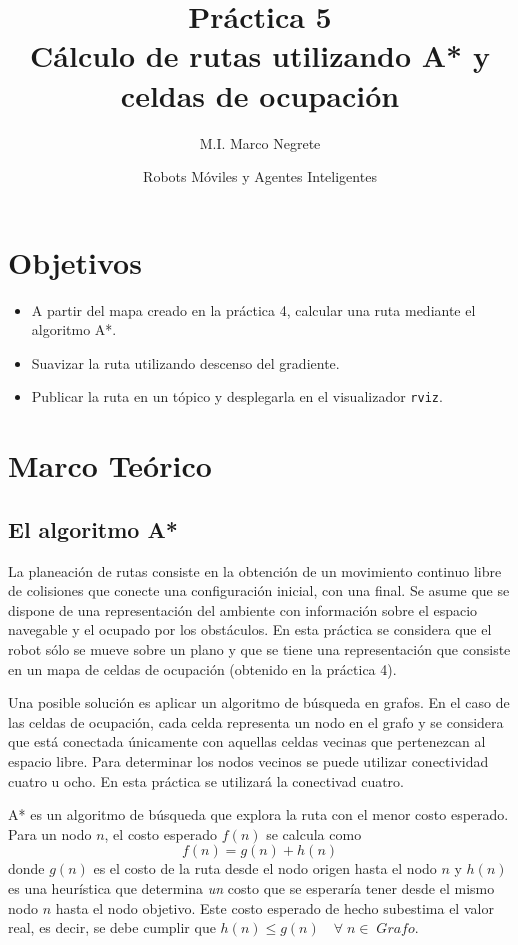 \documentclass[letterpaper,12pt]{article}
\title{Práctica 5  \\ Cálculo de rutas utilizando A* y celdas de ocupación}
\author{M.I. Marco Negrete}
\date{Robots Móviles y Agentes Inteligentes}
\begin{document}
\renewcommand{\tablename}{Tabla}
\maketitle
\section*{Objetivos}
\begin{itemize}
\item A partir del mapa creado en la práctica 4, calcular una ruta mediante el algoritmo A*.
\item Suavizar la ruta utilizando descenso del gradiente. 
\item Publicar la ruta en un tópico y desplegarla en el visualizador \texttt{rviz}.
\end{itemize}

\section{Marco Teórico}
\subsection{El algoritmo A*}
La planeación de rutas consiste en la obtención de un movimiento continuo libre de colisiones que conecte una configuración inicial, con una final. Se asume que se dispone de una representación del ambiente con información sobre el espacio navegable y el ocupado por los obstáculos. En esta práctica se considera que el robot sólo se mueve sobre un plano y que se tiene una representación que consiste en un mapa de celdas de ocupación (obtenido en la práctica 4). 

Una posible solución es aplicar un algoritmo de búsqueda en grafos. En el caso de las celdas de ocupación, cada celda representa un nodo en el grafo y se considera que está conectada únicamente con aquellas celdas vecinas que pertenezcan al espacio libre. Para determinar los nodos vecinos se puede utilizar conectividad cuatro u ocho. En esta práctica se utilizará la conectivad cuatro. 

A* es un algoritmo de búsqueda que explora la ruta con el menor costo esperado. Para un nodo $n$, el costo esperado $f(n)$ se calcula como 
\[f(n) = g(n) + h(n)\]
donde $g(n)$ es el costo de la ruta desde el nodo origen hasta el nodo $n$ y $h(n)$ es una heurística que determina \textit{un} costo que se esperaría tener desde el mismo nodo $n$ hasta el nodo objetivo. Este costo esperado de hecho subestima el valor real, es decir, se debe cumplir que $h(n) \leq g(n)\quad \forall\; n \in\; Grafo$. 
\end{document}
